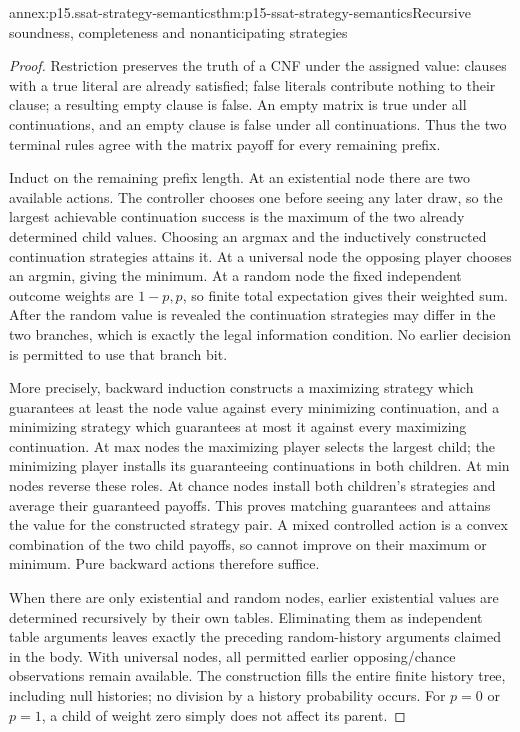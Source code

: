 \begin{annexitem}{annex:p15.ssat-strategy-semantics}{thm:p15-ssat-strategy-semantics}{Recursive soundness, completeness and nonanticipating strategies}
\begin{proof}
Restriction preserves the truth of a CNF under the assigned value:
clauses with a true literal are already satisfied; false literals
contribute nothing to their clause; a resulting empty clause is false.
An empty matrix is true under all continuations, and an empty clause
is false under all continuations. Thus the two terminal rules agree
with the matrix payoff for every remaining prefix.

Induct on the remaining prefix length. At an existential node there
are two available actions. The controller chooses one before seeing
any later draw, so the largest achievable continuation success is
the maximum of the two already determined child values. Choosing an
argmax and the inductively constructed continuation strategies attains
it. At a universal node the opposing player chooses an argmin, giving
the minimum. At a random node the fixed independent outcome weights
are \(1-p,p\), so finite total expectation gives their weighted
sum. After the random value is revealed the continuation strategies
may differ in the two branches, which is exactly the legal information
condition. No earlier decision is permitted to use that branch bit.

More precisely, backward induction constructs a maximizing strategy
which guarantees at least the node value against every minimizing
continuation, and a minimizing strategy which guarantees at most it
against every maximizing continuation. At max nodes the maximizing
player selects the largest child; the minimizing player installs its
guaranteeing continuations in both children. At min nodes reverse
these roles. At chance nodes install both children's strategies and
average their guaranteed payoffs. This proves matching guarantees
and attains the value for the constructed strategy pair. A mixed
controlled action is a convex combination of the two child payoffs,
so cannot improve on their maximum or minimum. Pure backward actions
therefore suffice.

When there are only existential and random nodes, earlier existential
values are determined recursively by their own tables. Eliminating
them as independent table arguments leaves exactly the preceding
random-history arguments claimed in the body. With universal nodes,
all permitted earlier opposing/chance observations remain available.
The construction fills the entire finite history tree, including null
histories; no division by a history probability occurs. For \(p=0\)
or \(p=1\), a child of weight zero simply does not affect its parent.


\end{proof}
\end{annexitem}
